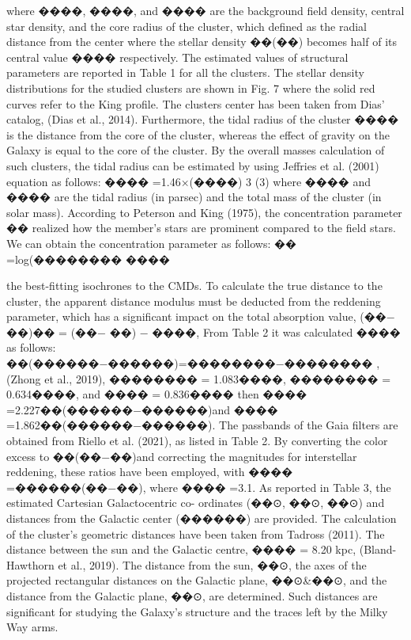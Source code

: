 \documentclass[../main.tex]{subfiles}
\begin{document}
{where ����, ����, and ���� are the background field density, central star
density, and the core radius of the cluster, which defined as the radial
distance from the center where the stellar density ��(��) becomes half
of its central value ���� respectively. The estimated values of structural
parameters are reported in Table 1 for all the clusters. The stellar
density distributions for the studied clusters are shown in Fig. 7 where
the solid red curves refer to the King profile. The clusters center has
been taken from Dias’ catalog, (Dias et al., 2014). Furthermore, the
tidal radius of the cluster ���� is the distance from the core of the cluster,
whereas the effect of gravity on the Galaxy is equal to the core of the
cluster. By the overall masses calculation of such clusters, the tidal
radius can be estimated by using Jeffries et al. (2001) equation as
follows:
���� =1.46×(����)
3 (3)
where ���� and ���� are the tidal radius (in parsec) and the total mass
of the cluster (in solar mass). According to Peterson and King (1975),
the concentration parameter �� realized how the member’s stars are
prominent compared to the field stars. We can obtain the concentration
parameter as follows:
�� =log(��������
����

the best-fitting isochrones to the CMDs. To calculate the true distance
to the cluster, the apparent distance modulus must be deducted from
the reddening parameter, which has a significant impact on the total
absorption value, (��− ��)�� = (��− ��) − ����, From Table 2 it was
calculated ���� as follows: ��(������−������)=��������−�������� , (Zhong et al.,
2019), ��������
= 1.083����, ��������
= 0.634����, and ���� = 0.836���� then
���� =2.227��(������−������)and ���� =1.862��(������−������). The passbands
of the Gaia filters are obtained from Riello et al. (2021), as listed in
Table 2. By converting the color excess to ��(��−��)and correcting the
magnitudes for interstellar reddening, these ratios have been employed,
with ���� =������(��−��), where ���� =3.1.
As reported in Table 3, the estimated Cartesian Galactocentric co-
ordinates (��⊙, ��⊙, ��⊙) and distances from the Galactic center (������)
are provided. The calculation of the cluster’s geometric distances have
been taken from Tadross (2011). The distance between the sun and
the Galactic centre, ���� = 8.20 kpc, (Bland-Hawthorn et al., 2019).
The distance from the sun, ��⊙, the axes of the projected rectangular
distances on the Galactic plane, ��⊙&��⊙, and the distance from the
Galactic plane, ��⊙, are determined. Such distances are significant for
studying the Galaxy’s structure and the traces left by the Milky Way
arms.

}
\end{document}
